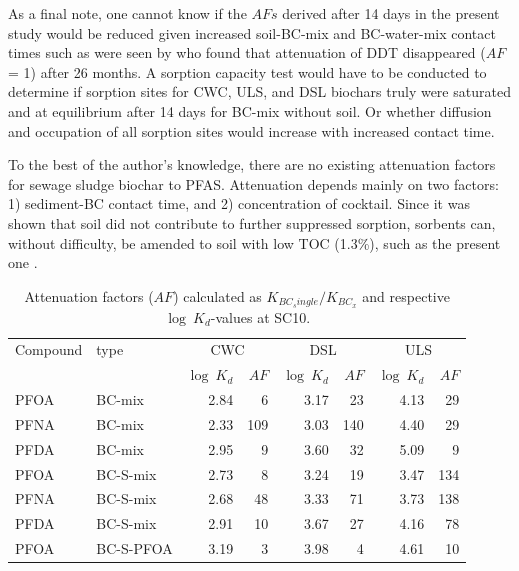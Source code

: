 As a final note, one cannot know if the $AFs$ derived after 14 days in the present study would be reduced given increased soil-BC-mix and BC-water-mix contact times such as were seen by \cite{hale2009sorption} who found that attenuation of DDT disappeared ($AF$ = 1) after 26 months. A sorption capacity test would have to be conducted to determine if sorption sites for CWC, ULS, and DSL biochars truly were saturated and at equilibrium after 14 days for BC-mix without soil. Or whether diffusion and occupation of all sorption sites would increase with increased contact time. 

To the best of the author's knowledge, there are no existing attenuation factors for sewage sludge biochar to PFAS. Attenuation depends mainly on two factors: 1) sediment-BC contact time, and 2) concentration of cocktail. Since it was shown that soil did not contribute to further suppressed sorption, sorbents can, without difficulty, be amended to soil with low \acrshort{TOC} (1.3\%), such as the present one \citep{Sormo2021}.


\begin{table}
\centering
\caption{Attenuation factors ($AF$) calculated as $K_{BC_single}/K_{BC_x}$ and respective $\log~K_d$-values at SC10.}
\label{tab:attenuation}
\begin{tabular}{llrrrrrr} \toprule
Compound & type & \multicolumn{2}{c}{CWC} & \multicolumn{2}{c}{DSL} & \multicolumn{2}{c}{ULS} \\ \cmidrule(l){3-4} \cmidrule(l){5-6} \cmidrule(l){7-8}
 &  & $\log~K_d$ & $AF$ & $\log~K_d$ & $AF$ & $\log~K_d$ & $AF$ \\ \midrule
PFOA & BC-mix & 2.84 & 6 & 3.17 & 23 & 4.13 & 29 \\
PFNA & BC-mix & 2.33 & 109 & 3.03 & 140 & 4.40 & 29 \\
PFDA & BC-mix & 2.95 & 9 & 3.60 & 32 & 5.09 & 9 \\ \addlinespace \hline \addlinespace
PFOA & BC-S-mix & 2.73 & 8 & 3.24 & 19 & 3.47 & 134 \\
PFNA & BC-S-mix & 2.68 & 48 & 3.33 & 71 & 3.73 & 138 \\
PFDA & BC-S-mix & 2.91 & 10 & 3.67 & 27 & 4.16 & 78 \\ \addlinespace \hline \addlinespace
PFOA & BC-S-PFOA & 3.19 & 3 & 3.98 & 4 & 4.61 & 10 \\ \bottomrule
\end{tabular}
\end{table}


